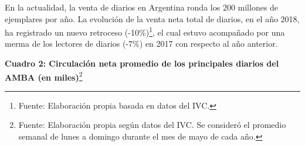 En la actualidad, la venta de diarios en Argentina ronda los 200 millones de ejemplares por año. La evolución de la venta neta total de diarios, en el año 2018, ha registrado un nuevo retroceso (-10\%)\footnote{Fuente: Elaboración propia basada en datos del IVC.}, el cual estuvo acompañado por una merma de los lectores de diarios (-7\%) en 2017 con respecto al año anterior.

\textbf{Cuadro 2: Circulación neta promedio de los principales diarios del AMBA (en miles)}\footnote{Fuente: Elaboración propia según datos del IVC. Se consideró el promedio semanal de lunes a domingo durante el mes de mayo de cada año.}

